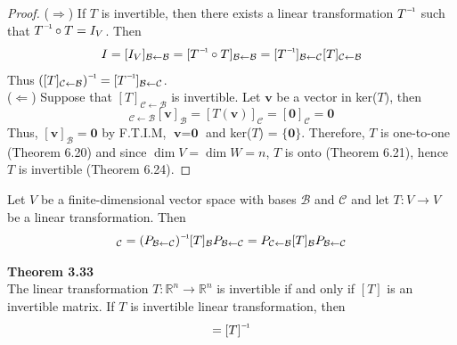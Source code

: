 \begin{proof}
	($\Rightarrow$) If $T$ is invertible, then there exists a linear transformation $\inv{T}$ such that $\inv{T} \circ T = I_V$. Then \begin{equation*}
		I = [I_V]_{ \mathcal{B} \leftarrow \mathcal{B} } = [\inv{T} \circ T]_{ \mathcal{B} \leftarrow \mathcal{B} } = [\inv{T}]_{ \mathcal{B} \leftarrow \mathcal{C} }[T]_{ \mathcal{C} \leftarrow \mathcal{B} }
	\end{equation*} Thus $\inv{([T]_{ \mathcal{C} \leftarrow \mathcal{B} })} = [\inv{T}]_{ \mathcal{B} \leftarrow \mathcal{C} }$. \\
	
	($\Leftarrow$) Suppose that $[T]_{ \mathcal{C} \leftarrow \mathcal{B} }$ is invertible. Let $\textbf{v}$ be a vector in ker($T$), then \begin{equation*}
		[T]_{ \mathcal{C} \leftarrow \mathcal{B} }[\textbf{v}]_\mathcal{B} = [T(\textbf{v})]_\mathcal{C} = [\textbf{0}]_\mathcal{C} = \textbf{0}
	\end{equation*} Thus, $[\textbf{v}]_\mathcal{B} = \textbf{0}$ by F.T.I.M, $\textbf{v} = \textbf{0}$ and  ker($T$) = $\{\textbf{0}\}$. Therefore, $T$ is one-to-one (Theorem 6.20) and since $\dim V = \dim W = n$, $T$ is onto (Theorem 6.21), hence $T$ is invertible (Theorem 6.24).
\end{proof}

\begin{theorem}
	Let $V$ be a finite-dimensional vector space with bases $\mathcal{B}$ and $\mathcal{C}$ and let $T: V \rightarrow V$ be a linear transformation. Then \begin{equation*}
		[T]_{ \mathcal{C} } = \inv{(P_{ \mathcal{B} \leftarrow \mathcal{C}})} [T]_{ \mathcal{B} } P_{ \mathcal{B} \leftarrow \mathcal{C} } = P_{ \mathcal{C} \leftarrow \mathcal{B} } [T]_{ \mathcal{B}  } P_{ \mathcal{B} \leftarrow \mathcal{C} }
	\end{equation*}
\end{theorem}

\textbf{Theorem 3.33} \\
The linear transformation $T: \mathbb{R}^n \rightarrow \mathbb{R}^n$ is invertible if and only if $[T]$ is an invertible matrix. If $T$ is invertible linear transformation, then \begin{equation*}
	[\inv{T}] = \inv{[T]}
\end{equation*}


